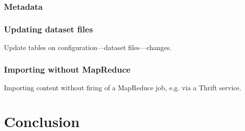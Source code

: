 \documentclass[a4paper,10pt]{book}
\begin{document}
\subsection{Metadata}

\subsection{Updating dataset files}

Update tables on configuration---dataset files---changes.

\subsection{Importing without MapReduce}

Importing content without firing of a MapReduce job, e.g. via a Thrift
service.



\chapter{Conclusion}



\pagebreak



 
\end{document}
